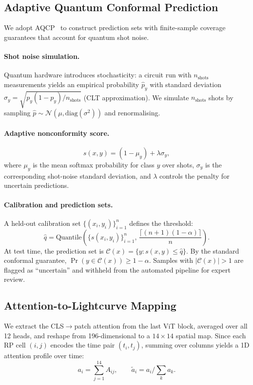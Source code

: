 \documentclass{article}
\begin{document}
\subsection{Adaptive Quantum Conformal Prediction}
\label{sec:uq}

We adopt AQCP~\citep{aqcp2025} to construct prediction sets with finite-sample
coverage guarantees that account for quantum shot noise.

\paragraph{Shot noise simulation.}
Quantum hardware introduces stochasticity: a circuit run with $n_\text{shots}$
measurements yields an empirical probability $\hat{p}_y$ with standard deviation
$\sigma_y = \sqrt{p_y(1-p_y)/n_\text{shots}}$ (CLT approximation).
We simulate $n_\text{shots}$ shots by sampling
$\hat{p} \sim \mathcal{N}(\mu, \text{diag}(\sigma^2))$ and renormalising.

\paragraph{Adaptive nonconformity score.}
\[
s(x, y) = (1 - \mu_y) + \lambda \sigma_y,
\]
where $\mu_y$ is the mean softmax probability for class $y$ over shots,
$\sigma_y$ is the corresponding shot-noise standard deviation, and $\lambda$
controls the penalty for uncertain predictions.

\paragraph{Calibration and prediction sets.}
A held-out calibration set $\{(x_i, y_i)\}_{i=1}^n$ defines the threshold:
\[
\hat{q} = \text{Quantile}\!\left(\{s(x_i, y_i)\}_{i=1}^n,\,
           \frac{\lceil (n+1)(1-\alpha) \rceil}{n}\right).
\]
At test time, the prediction set is $\mathcal{C}(x) = \{y : s(x,y) \le \hat{q}\}$.
By the standard conformal guarantee, $\Pr(y \in \mathcal{C}(x)) \ge 1 - \alpha$.
Samples with $|\mathcal{C}(x)| > 1$ are flagged as ``uncertain'' and withheld
from the automated pipeline for expert review.

\subsection{Attention-to-Lightcurve Mapping}
\label{sec:interp}

We extract the CLS$\to$patch attention from the last ViT block, averaged
over all 12 heads, and reshape from 196-dimensional to a $14 \times 14$ spatial
map.  Since each RP cell $(i,j)$ encodes the time pair $(t_i, t_j)$, summing
over columns yields a 1D attention profile over time:
\[
a_i = \sum_{j=1}^{14} A_{ij}, \qquad \tilde{a}_i = a_i / \textstyle\sum_k a_k.
\]
\end{document}
